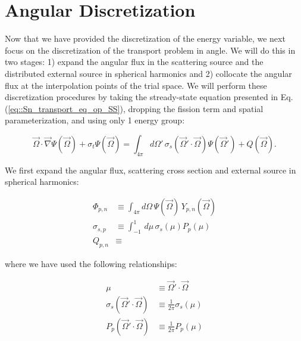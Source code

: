 \section{Angular Discretization}
\label{sec::Sn_Angle}

Now that we have provided the discretization of the energy variable, we next focus on the discretization of the transport problem in angle. We will do this in two stages: 1) expand the angular flux in the scattering source and the distributed external source in spherical harmonics and 2) collocate the angular flux at the interpolation points of the trial space. We will perform these discretization procedures by taking the stready-state equation presented in Eq. (\ref{eq::Sn_transport_eq_op_SS}), dropping the fission term and spatial parameterization, and using only 1 energy group:

\begin{equation}
\label{eq::Sn_Angle_simple_trans_eq}
\vec{\Omega} \cdot \vec{\nabla} \Psi (\vec{\Omega}) + \sigma_t \Psi (\vec{\Omega}) = \int_{4 \pi}  d\Omega' \, \sigma_s ( \vec{\Omega}' \cdot \vec{\Omega}) \Psi (\vec{\Omega}') + Q  (\vec{\Omega}) .
\end{equation}

We first expand the angular flux, scattering cross section and external source in spherical harmonics:

\begin{equation}
\label{eq::Sn_Angle_moments}
\begin{aligned}
	\Phi_{p,n} &\equiv \int_{4 \pi} d\Omega \, \Psi(\vec{\Omega}) \, Y_{p,n} (\vec{\Omega}) \\
	\sigma_{s,p} &\equiv  \int_{-1}^{1} \, d \mu \, \sigma_s ( \mu) P_p (\mu)  \\
	Q_{p,n} &\equiv 
\end{aligned}
\end{equation}

\noindent where we have used the following relationships:

\begin{equation}
\label{eq::Sn_Angle_other_terms}
\begin{aligned}
	\mu &\equiv \vec{\Omega}' \cdot \vec{\Omega} \\
	\sigma_s ( \vec{\Omega}' \cdot \vec{\Omega}) &\equiv  \frac{1}{2 \pi} \sigma_s ( \mu ) \\
	P_p ( \vec{\Omega}' \cdot \vec{\Omega}) &\equiv  \frac{1}{2 \pi} P_p (\mu)
\end{aligned}
\end{equation}

